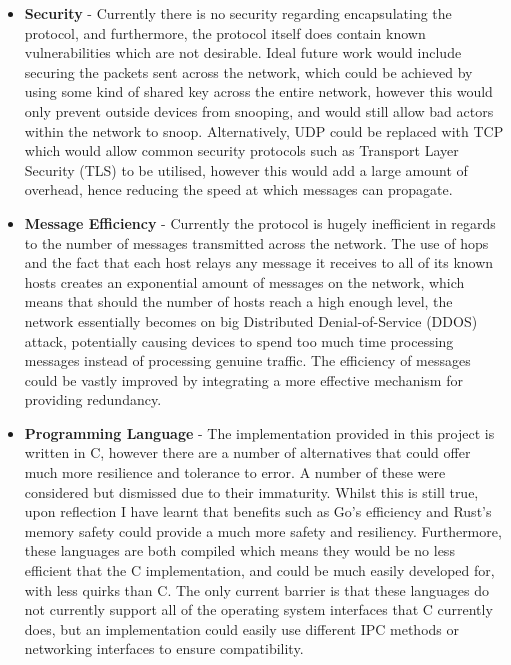 \documentclass[a4paper, 11pt]{report}
\begin{document}
\begin{itemize}
\item \textbf{Security} - Currently there is no security regarding encapsulating the protocol, and furthermore, the protocol itself does contain known vulnerabilities which are not desirable. Ideal future work would include securing the packets sent across the network, which could be achieved by using some kind of shared key across the entire network, however this would only prevent outside devices from snooping, and would still allow bad actors within the network to snoop. Alternatively, \acrshort{UDP} could be replaced with \acrshort{TCP} which would allow common security protocols such as Transport Layer Security (TLS) to be utilised, however this would add a large amount of overhead, hence reducing the speed at which messages can propagate.

\item \textbf{Message Efficiency} - Currently the protocol is hugely inefficient in regards to the number of messages transmitted across the network. The use of hops and the fact that each host relays any message it receives to all of its known hosts creates an exponential amount of messages on the network, which means that should the number of hosts reach a high enough level, the network essentially becomes on big Distributed Denial-of-Service (DDOS) attack, potentially causing devices to spend too much time processing messages instead of processing genuine traffic. The efficiency of messages could be vastly improved by integrating a more effective mechanism for providing redundancy.

\item \textbf{Programming Language} - The implementation provided in this project is written in C, however there are a number of alternatives that could offer much more resilience and tolerance to error. A number of these were considered but dismissed due to their immaturity. Whilst this is still true, upon reflection I have learnt that benefits such as Go's efficiency and Rust's memory safety could provide a much more safety and resiliency. Furthermore, these languages are both compiled which means they would be no less efficient that the C implementation, and could be much easily developed for, with less quirks than C. The only current barrier is that these languages do not currently support all of the operating system interfaces that C currently does, but an implementation could easily use different \acrshort{IPC} methods or networking interfaces to ensure compatibility.

\end{itemize}
\end{document}
